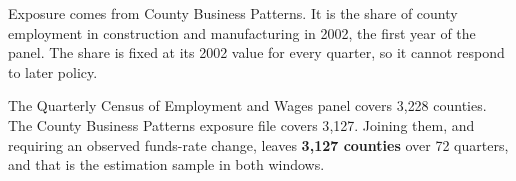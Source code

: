 Exposure comes from County Business Patterns. It is the share of county
employment in construction and manufacturing in 2002, the first year of the
panel. The share is fixed at its 2002 value for every quarter, so it cannot
respond to later policy.

The Quarterly Census of Employment and Wages panel covers 3{,}228 counties. The
County Business Patterns exposure file covers 3{,}127. Joining them, and
requiring an observed funds-rate change, leaves \textbf{3{,}127 counties} over
72 quarters, and that is the estimation sample in both windows.

